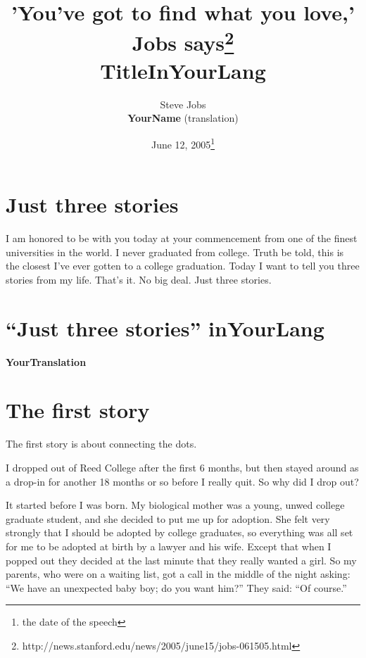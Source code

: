 \documentclass[a4,twocolumn]{article}
\begin{document}
\title{'You've got to find what you love,' Jobs says\footnote{http://news.stanford.edu/news/2005/june15/jobs-061505.html} \\
{\bf TitleInYourLang}}
\date{June 12, 2005\footnote{the date of the speech}}
\author{Steve Jobs \\ {\bf YourName} (translation)}

\maketitle

\section*{Just three stories}

I am honored to be with you today at your commencement from one of the finest universities in the world.
I never graduated from college.
Truth be told, this is the closest I've ever gotten to a college graduation.
Today I want to tell you three stories from my life.
That's it.
No big deal.
Just three stories.

\newpage

\section*{``Just three stories'' inYourLang}

{\bf YourTranslation}

\newpage

\section*{The first story}

The first story is about connecting the dots.

I dropped out of Reed College after the first 6 months, but then stayed around as a drop-in for another 18 months or so before I really quit. So why did I drop out?


It started before I was born. My biological mother was a young, unwed college graduate student, and she decided to put me up for adoption. She felt very strongly that I should be adopted by college graduates, so everything was all set for me to be adopted at birth by a lawyer and his wife. Except that when I popped out they decided at the last minute that they really wanted a girl. So my parents, who were on a waiting list, got a call in the middle of the night asking: ``We have an unexpected baby boy; do you want him?'' They said: ``Of course.''
\end{document}

